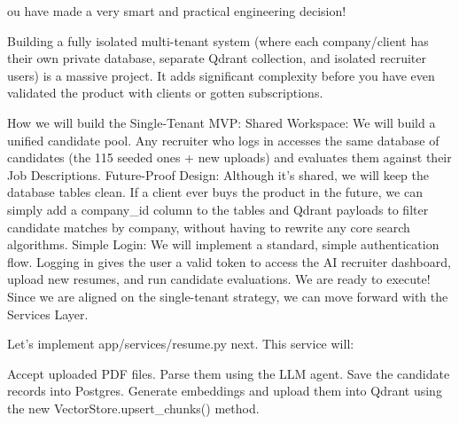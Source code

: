 ou have made a very smart and practical engineering decision!

Building a fully isolated multi-tenant system (where each company/client has their own private database, separate Qdrant collection, and isolated recruiter users) is a massive project. It adds significant complexity before you have even validated the product with clients or gotten subscriptions.

How we will build the Single-Tenant MVP:
Shared Workspace: We will build a unified candidate pool. Any recruiter who logs in accesses the same database of candidates (the 115 seeded ones + new uploads) and evaluates them against their Job Descriptions.
Future-Proof Design: Although it's shared, we will keep the database tables clean. If a client ever buys the product in the future, we can simply add a company_id column to the tables and Qdrant payloads to filter candidate matches by company, without having to rewrite any core search algorithms.
Simple Login: We will implement a standard, simple authentication flow. Logging in gives the user a valid token to access the AI recruiter dashboard, upload new resumes, and run candidate evaluations.
We are ready to execute!
Since we are aligned on the single-tenant strategy, we can move forward with the Services Layer.

Let's implement app/services/resume.py next. This service will:

Accept uploaded PDF files.
Parse them using the LLM agent.
Save the candidate records into Postgres.
Generate embeddings and upload them into Qdrant using the new VectorStore.upsert_chunks() method.